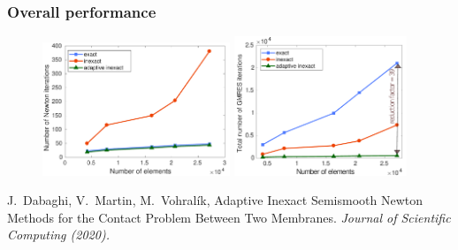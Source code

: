\begin{frame}
\frametitle{Overall performance}
\begin{figure}
\includegraphics[width=0.5\textwidth]{p2/P2_number_Newton_iter_per_elements}  
\quad  
 \includegraphics[width=0.46\textwidth]{P2_tot_number_GMRES_iter_per_elements}
\end{figure}
\begin{thebibliography}{10}
 \scriptsize{
 {\sc J.~Dabaghi, V.~Martin, M.~Vohral\'{i}k}, Adaptive Inexact Semismooth Newton Methods for the
Contact Problem Between Two Membranes.
\em{Journal of Scientific Computing} (2020).
}
 \end{thebibliography}
\end{frame}
